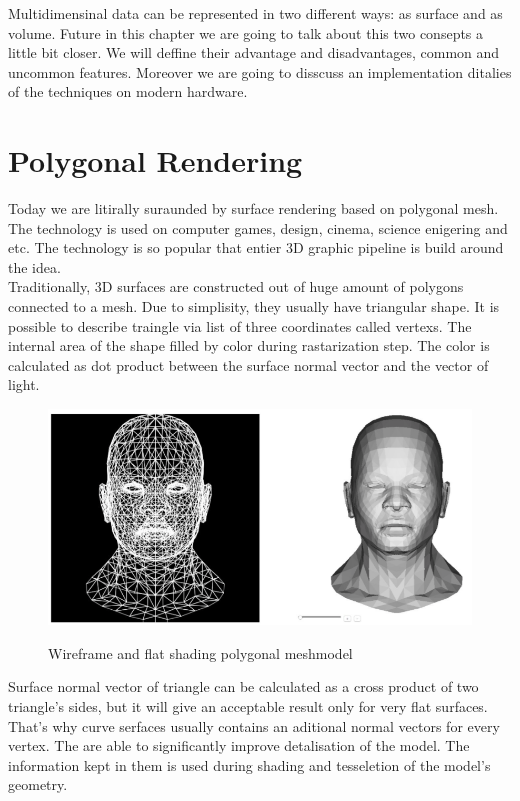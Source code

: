 \documentclass[english, 11pt]{report}
\begin{document}
Multidimensinal data can be represented in two different ways: as surface and as volume. Future in this chapter we are going to talk about this two consepts a little bit closer. We will deffine their advantage and disadvantages, common and uncommon features. Moreover we are going to disscuss an implementation ditalies of the techniques on modern hardware.



\section{Polygonal Rendering}

Today we are litirally suraunded by surface rendering based on polygonal mesh. The technology is used on computer games, design, cinema, science enigering and etc. The technology is so popular that entier 3D graphic pipeline is build around the idea.\\

Traditionally, 3D surfaces are constructed out of huge amount of polygons connected to a mesh. Due to simplisity, they usually have triangular shape. It is possible to describe traingle via list of three coordinates called vertexs. The internal area of the shape filled by color during rastarization step. The color is calculated as dot product between the surface normal vector and the vector of light.

\begin{figure}[H]
\includegraphics[scale=0.55]{img/mesh}\\
\caption{Wireframe and flat shading polygonal meshmodel}
\end{figure}

Surface normal vector of triangle can be calculated as a cross product of two triangle's sides, but it will give an acceptable result only for very flat surfaces. That's why curve serfaces usually contains an aditional normal vectors for every vertex. The are able to significantly improve detalisation of the model. The information kept in them is used during shading and tesseletion of the model's geometry.
\end{document}
